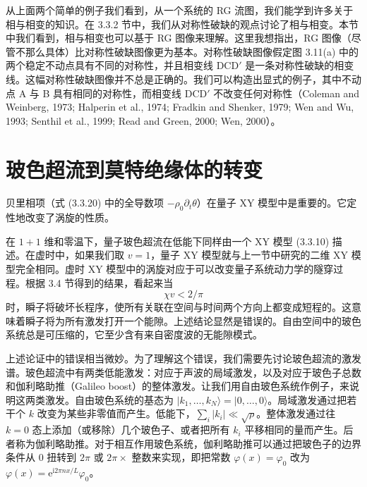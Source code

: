 从上面两个简单的例子我们看到，从一个系统的 RG 流图，我们能学到许多关于相与相变的知识。在 3.3.2 节中，我们从对称性破缺的观点讨论了相与相变。本节中我们看到，相与相变也可以基于 RG 图像来理解。这里我想指出，RG 图像（尽管不那么具体）比对称性破缺图像更为基本。对称性破缺图像假定图 3.11(a) 中的两个稳定不动点具有不同的对称性，并且相变线 DCD$'$ 是一条对称性破缺的相变线。这幅对称性破缺图像并不总是正确的。我们可以构造出显式的例子，其中不动点 A 与 B 具有相同的对称性，而相变线 DCD$'$ 不改变任何对称性（Coleman and Weinberg, 1973; Halperin et al., 1974; Fradkin and Shenker, 1979; Wen and Wu, 1993; Senthil et al., 1999; Read and Green, 2000; Wen, 2000）。

\section{玻色超流到莫特绝缘体的转变}

\begin{keypoints}
\item 贝里相项（式 (3.3.20) 中的全导数项 $-\rho_0\partial_t\theta$）在量子 XY 模型中是重要的。它定性地改变了涡旋的性质。
\end{keypoints}

在 $1+1$ 维和零温下，量子玻色超流在低能下同样由一个 XY 模型 (3.3.10) 描述。在虚时中，如果我们取 $v = 1$，量子 XY 模型就与上一节中研究的二维 XY 模型完全相同。虚时 XY 模型中的涡旋对应于可以改变量子系统动力学的隧穿过程。根据 3.4 节得到的结果，看起来当
\begin{equation*}
\chi v < 2/\pi
\end{equation*}
时，瞬子将破坏长程序，使所有关联在空间与时间两个方向上都变成短程的。这意味着瞬子将为所有激发打开一个能隙。上述结论显然是错误的。自由空间中的玻色系统总是可压缩的，它至少含有来自密度波的无能隙模式。

上述论证中的错误相当微妙。为了理解这个错误，我们需要先讨论玻色超流的激发谱。玻色超流中有两类低能激发：对应于声波的局域激发，以及对应于玻色子总数和伽利略助推（Galileo boost）的整体激发。让我们用自由玻色系统作例子，来说明这两类激发。自由玻色系统的基态为 $|k_1,\ldots,k_N\rangle = |0,\ldots,0\rangle$。局域激发通过把若干个 $k$ 改变为某些非零值而产生。低能下，$\sum_i |k_i| \ll \sqrt{\rho}$。整体激发通过往 $k = 0$ 态上添加（或移除）几个玻色子、或者把所有 $k_i$ 平移相同的量而产生。后者称为伽利略助推。对于相互作用玻色系统，伽利略助推可以通过把玻色子的边界条件从 $0$ 扭转到 $2\pi$ 或 $2\pi\times$ 整数来实现，即把常数 $\varphi(x) = \varphi_0$ 改为 $\varphi(x) = \mathrm{e}^{\mathrm{i}2\pi nx/L}\varphi_0$。

